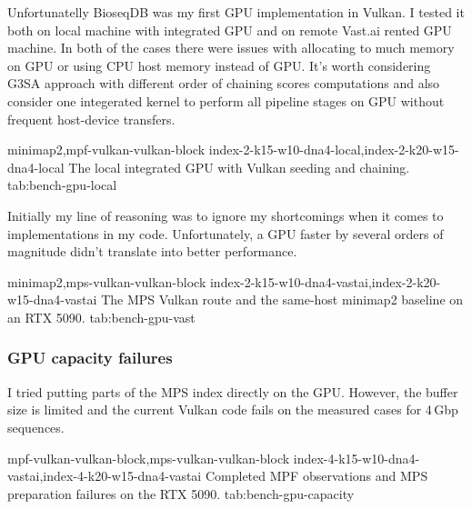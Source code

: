 Unfortunatelly BioseqDB was my first GPU implementation in Vulkan. I tested it both on local machine with integrated GPU and on remote Vast.ai rented GPU machine.
In both of the cases there were issues with allocating to much memory on GPU or using CPU host memory instead of GPU.
It's worth considering G3SA approach with different order of chaining scores computations and also consider one integerated kernel to perform all pipeline stages on GPU without frequent host-device
transfers.


  {minimap2,mpf-vulkan-vulkan-block}
  {index-2-k15-w10-dna4-local,index-2-k20-w15-dna4-local}
  {The local integrated GPU with Vulkan seeding and chaining.}
  {tab:bench-gpu-local}

Initially my line of reasoning was to ignore my shortcomings when it comes to implementations in my code. Unfortunately, a GPU faster by several orders of magnitude didn't translate into better performance.

  {minimap2,mps-vulkan-vulkan-block}
  {index-2-k15-w10-dna4-vastai,index-2-k20-w15-dna4-vastai}
  {The MPS Vulkan route and the same-host minimap2 baseline on an RTX 5090.}
  {tab:bench-gpu-vast}


\subsubsection{GPU capacity failures}
\label{sec:bench-gpu-capacity}

I tried putting parts of the MPS index directly on the GPU. However, the buffer size is limited and the current Vulkan code fails on the measured cases for 4\,Gbp sequences.

  {mpf-vulkan-vulkan-block,mps-vulkan-vulkan-block}
  {index-4-k15-w10-dna4-vastai,index-4-k20-w15-dna4-vastai}
  {Completed MPF observations and MPS preparation failures on the RTX 5090.}
  {tab:bench-gpu-capacity}

\clearpage
\endgroup
